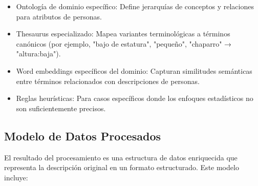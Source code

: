 \documentclass[12pt,a4paper]{article}
\begin{document}
\begin{itemize}
    \item Ontología de dominio específico: Define jerarquías de conceptos y relaciones para atributos de personas.
    
    \item Thesaurus especializado: Mapea variantes terminológicas a términos canónicos (por ejemplo, "bajo de estatura", "pequeño", "chaparro" → "altura:baja").
    
    \item Word embeddings específicos del dominio: Capturan similitudes semánticas entre términos relacionados con descripciones de personas.
    
    \item Reglas heurísticas: Para casos específicos donde los enfoques estadísticos no son suficientemente precisos.
\end{itemize}

\subsection{Modelo de Datos Procesados}
\label{subsec:dp-modelo-datos}

El resultado del procesamiento es una estructura de datos enriquecida que representa la descripción original en un formato estructurado. Este modelo incluye:
\end{document}
